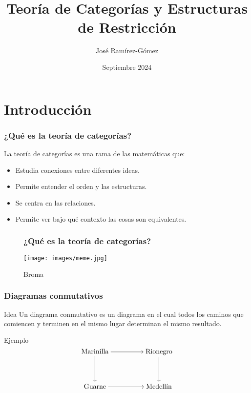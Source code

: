\documentclass[10pt, aspectratio = 43,usenames,dvipsnames]{beamer}
\title{Teoría de Categorías y Estructuras de Restricción}
\author{José Ramírez-Gómez}
\institute{Universiad EAFIT}
\date{Septiembre 2024}
\begin{document}
	\onehalfspacing
	
	\frame[plain]{\titlepage}
	
	\section{Introducción}
	\begin{frame}[t]
		\frametitle{¿Qué es la teoría de categorías?}
		La teoría de categorías es una rama de las matemáticas que:
		\begin{itemize}
			\item Estudia conexiones entre diferentes ideas.
			\item Permite entender el orden y las estructuras.
			\item Se centra en las relaciones.
			\item Permite ver bajo qué contexto las cosas son equivalentes.
		\end{itemize}
	\end{frame}
	
	\begin{frame}[t]
		\begin{figure}[h!]
			\frametitle{¿Qué es la teoría de categorías?}
			\begin{center}
				\texttt{[image: images/meme.jpg]}
				\caption{Broma}
			\end{center}
		\end{figure}
	\end{frame}
	
	\begin{frame}[t]
		\frametitle{Diagramas conmutativos}
		\begin{block}{Idea}
			Un diagrama conmutativo es un diagrama en el cual todos los caminos que comiencen y terminen en el mismo lugar determinan el mismo resultado.
		\end{block}
		\begin{block}{Ejemplo}
			\[\begin{tikzcd}[ampersand replacement=\&,cramped]
				{\text{Marinilla}} \&\& {\text{Rionegro}} \\
				\\
				{\text{Guarne}} \&\& {\text{Medellín}}
				\arrow[from=1-1, to=1-3]
				\arrow[from=1-1, to=3-1]
				\arrow[from=1-3, to=3-3]
				\arrow[from=3-1, to=3-3]
			\end{tikzcd}\]
		\end{block}
	\end{frame}
	
\end{document}
